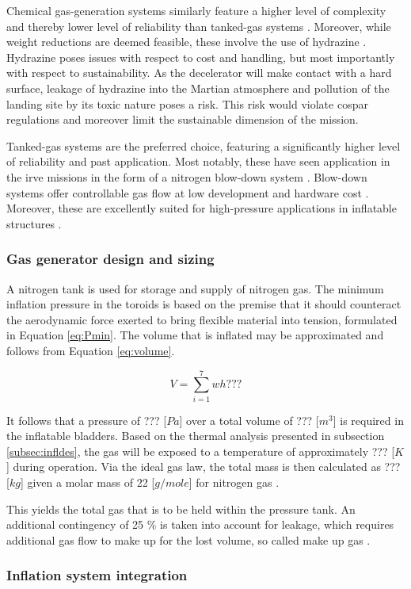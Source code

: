 Chemical gas-generation systems similarly feature a higher level of complexity and thereby lower level of reliability than tanked-gas systems \cite{Jenkins2001}. Moreover, while weight reductions are deemed feasible, these involve the use of hydrazine \cite{Jenkins2001, Freeland1998}. Hydrazine poses issues with respect to cost and handling, but most importantly with respect to sustainability. As the decelerator will make contact with a hard surface, leakage of hydrazine into the Martian atmosphere and pollution of the landing site by its toxic nature poses a risk. This risk would violate \gls{cospar} regulations and moreover limit the sustainable dimension of the mission.

Tanked-gas systems are the preferred choice, featuring a significantly higher level of reliability and past application. Most notably, these have seen application in the \gls{irve} missions in the form of a nitrogen blow-down system \cite{Smith2010}. Blow-down systems offer controllable gas flow at low development and hardware cost \cite{Freeland1998}. Moreover, these are excellently suited for high-pressure applications in inflatable structures \cite{Jenkins2001}.

\subsubsection{Gas generator design and sizing}
A nitrogen tank is used for storage and supply of nitrogen gas. The minimum inflation pressure in the toroids is based on the premise that it should counteract the aerodynamic force exerted to bring flexible material into tension, formulated in Equation \ref{eq:Pmin}. The volume that is inflated may be approximated and follows from Equation \ref{eq:volume}.

\begin{equation}
V = \sum_{i=1}^{7} wh ???
\label{eq:volume}
\end{equation}

It follows that a pressure of  ??? [$Pa$] over a total volume of ??? [$m^{3}$] is required in the inflatable bladders. Based on the thermal analysis presented in subsection \ref{subsec:infldes}, the gas will be exposed to a temperature of approximately ??? [$K$] during operation. Via the ideal gas law, the total mass is then calculated as ??? [$kg$] given a molar mass of 22 [$g/mole$] for nitrogen gas \cite{Samareh2011}.

This yields the total gas that is to be held within the pressure tank. An additional contingency of 25 $\%$ is taken into account for leakage, which requires additional gas flow to make up for the lost volume, so called make up gas \cite{Jenkins2001}.

\subsubsection{Inflation system integration}








